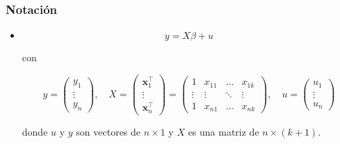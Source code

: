\documentclass{beamer}
\begin{document}
\begin{frame}
\frametitle{Notación}

\begin{itemize}
     \item 
    \[ y = X\beta + u \]
    
    con
    
    \[ y = \begin{pmatrix}
    y_1 \\
    \vdots \\
    y_n
    \end{pmatrix}, \quad
    X = \begin{pmatrix}
    \mathbf{x}_1^\top \\
    \vdots \\
    \mathbf{x}_n^\top
    \end{pmatrix} = \begin{pmatrix}
    1 & x_{11} & \dots & x_{1k} \\
    \vdots & \vdots & \ddots & \vdots \\
    1 & x_{n1} & \dots & x_{nk}
    \end{pmatrix}, \quad
    u = \begin{pmatrix}
    u_1 \\
    \vdots \\
    u_n
    \end{pmatrix} \]
    
    donde $u$ y $y$ son vectores de $n \times 1$ y $X$ es una matriz de $n \times (k + 1)$.
\end{itemize}

\end{frame}
\end{document}

